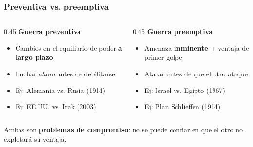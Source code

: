 \begin{frame}
\frametitle{Preventiva vs. preemptiva}
\centering

\vspace{5pt}
\begin{columns}[T]
\begin{column}{0.45\textwidth}
\centering
\textbf{Guerra preventiva}

\vspace{8pt}
\footnotesize
\begin{itemize}
  \item Cambios en el equilibrio de poder \textbf{a largo plazo}
  \item Luchar \textit{ahora} antes de debilitarse
  \item Ej: Alemania vs. Rusia (1914)
  \item Ej: EE.UU. vs. Irak (2003)
\end{itemize}
\end{column}
\begin{column}{0.45\textwidth}
\centering
\textbf{Guerra preemptiva}

\vspace{8pt}
\footnotesize
\begin{itemize}
  \item Amenaza \textbf{inminente} + ventaja de primer golpe
  \item Atacar antes de que el otro ataque
  \item Ej: Israel vs. Egipto (1967)
  \item Ej: Plan Schlieffen (1914)
\end{itemize}
\end{column}
\end{columns}

\vspace{10pt}
\footnotesize
Ambas son \textbf{problemas de compromiso}: no se puede confiar en que el otro no explotará su ventaja.

\end{frame}

